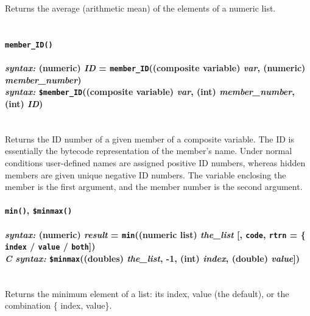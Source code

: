 \documentclass{article}
\begin{document}
Returns the average (arithmetic mean) of the elements of a numeric list.\\\\





\paragraph{\texttt{member\_ID()}\\\\
\normalfont \emph{syntax: } (numeric) \emph{ID} = \texttt{member\_ID}((composite variable) \emph{var}, (numeric) \emph{member\_number})\\
\normalfont \emph{syntax: } \texttt{\$member\_ID}((composite variable) \emph{var}, (int) \emph{member\_number}, (int) \emph{ID})\\\\}

Returns the ID number of a given member of a composite variable.  The ID is essentially the bytecode representation of the member's name.  Under normal conditions user-defined names are assigned positive ID numbers, whereas hidden members are given unique negative ID numbers.  The variable enclosing the member is the first argument, and the member number is the second argument.\\





\paragraph{\texttt{min()}, \texttt{\$minmax()}\\\\
\normalfont \emph{syntax: } (numeric) \emph{result} = \texttt{min}((numeric list) \emph{the\_list} [, \texttt{code}, \texttt{rtrn} = \{ \texttt{index} / \texttt{value} / \texttt{both}])\\
\normalfont \emph{C syntax: } \texttt{\$minmax}((doubles) \emph{the\_list}, -1, (int) \emph{index}, (double) \emph{value}])\\\\}

Returns the minimum element of a list:  its index, value (the default), or the combination \{ index, value\}.\\\\
\end{document}
